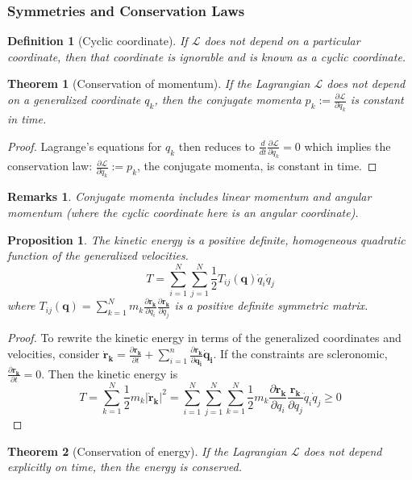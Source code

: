 \documentclass[a4paper]{article}
\newtheorem{remarks}{Remarks}[section]
\theoremstyle{new}
\newtheorem{defi}{Definition}[section]
\newtheorem{thm}{Theorem}[section]
\newtheorem{prop}{Proposition}[section]
\begin{document}
\subsubsection{Symmetries and Conservation Laws}
\begin{defi}[Cyclic coordinate]
If $\mathcal{L}$ does not depend on a particular coordinate, then that coordinate is ignorable and is known as a cyclic coordinate.
\end{defi}
\begin{thm}[Conservation of momentum]
If the Lagrangian $\mathcal{L}$ does not depend on a generalized coordinate $q_k$, then the conjugate momenta $p_k:=\frac{\partial\mathcal{L}}{\partial\dot{q}_k}$ is constant in time.
\end{thm}
\begin{proof}
Lagrange's equations for $q_k$ then reduces to $\frac{d}{dt}\frac{\partial\mathcal{L}}{\partial\dot{q}_k}=0$ which implies the conservation law: $\frac{\partial\mathcal{L}}{\partial\dot{q}_k}:=p_k$, the conjugate momenta, is constant in time.
\end{proof}
\begin{remarks}
Conjugate momenta includes linear momentum and angular momentum (where the cyclic coordinate here is an angular coordinate).
\end{remarks}
\begin{prop}
The kinetic energy is a positive definite, homogeneous quadratic function of the generalized velocities.
$$T=\sum_{i=1}^N\sum_{j=1}^N\frac{1}{2}T_{ij}(\mathbf{q})\dot{q}_i\dot{q}_j$$ 
where $T_{ij}(\mathbf{q})=\sum_{k=1}^Nm_k\frac{\partial\mathbf{r_k}}{\partial q_i}\frac{\partial\mathbf{r_k}}{\partial q_j}$ is a positive definite symmetric matrix.
\end{prop}
\begin{proof}
To rewrite the kinetic energy in terms of the generalized coordinates and velocities, consider $\mathbf{\dot{r}_k}=\frac{\partial\mathbf{r_k}}{\partial t}+\sum_{i=1}^n\frac{\partial\mathbf{r_k}}{\partial\mathbf{q_i}}\mathbf{\dot{q}_i}$. If the constraints are scleronomic, $\frac{\partial\mathbf{r_k}}{\partial t}=0$. Then the kinetic energy is
$$T=\sum_{k=1}^N\frac{1}{2}m_k|\mathbf{\dot{r}_k}|^2=\sum_{i=1}^N\sum_{j=1}^N\sum_{k=1}^N\frac{1}{2}m_k\frac{\partial\mathbf{r_k}}{\partial q_i}\frac{\mathbf{r_k}}{\partial q_j}\dot{q}_i\dot{q}_j\geq0$$
\end{proof}
\begin{thm}[Conservation of energy]
If the Lagrangian $\mathcal{L}$ does not depend explicitly on time, then the energy is conserved.
\end{thm}
\end{document}
